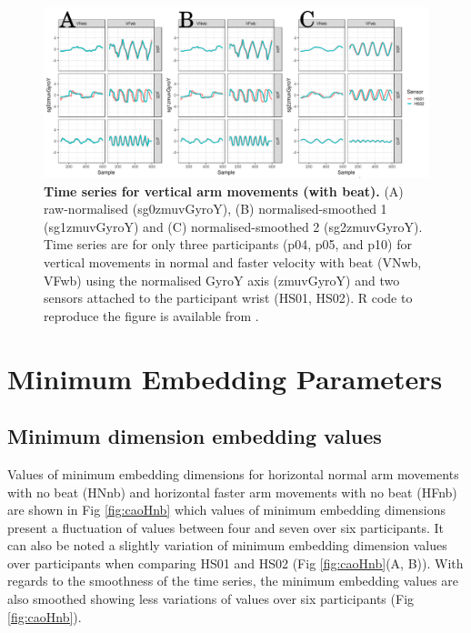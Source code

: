 \begin{figure}[!h]
\centering
\includegraphics[width=1.0\textwidth]{tsVwb}
    	\caption{ 
	{\bf Time series for vertical arm movements (with beat).}
		(A) raw-normalised (sg0zmuvGyroY), 
		(B) normalised-smoothed 1 (sg1zmuvGyroY) and
		(C) normalised-smoothed 2 (sg2zmuvGyroY).
		Time series are for only three participants (p04, p05, and p10) 
		for vertical movements in normal and faster velocity with
		beat (VNwb, VFwb) using the normalised 
		GyroY axis (zmuvGyroY) and two sensors attached to 
		the participant wrist (HS01, HS02).
	R code to reproduce the figure is available from \cite{hwum2018}.
        }
    \label{fig:tsVwb}
\end{figure}





\section{Minimum Embedding Parameters}

\subsection{Minimum dimension embedding values}
Values of minimum embedding dimensions for horizontal normal arm movements 
with no beat (HNnb) and horizontal faster arm movements 
with no beat (HFnb) are shown in Fig \ref{fig:caoHnb} which values of 
minimum embedding dimensions present a fluctuation of values between four 
and seven over six participants.
It can also be noted a slightly variation of minimum embedding dimension values 
over participants when comparing HS01 and HS02 (Fig \ref{fig:caoHnb}(A, B)).
With regards to the smoothness of the time series,
the minimum embedding values are also smoothed showing less variations of
values over six participants (Fig \ref{fig:caoHnb}).

